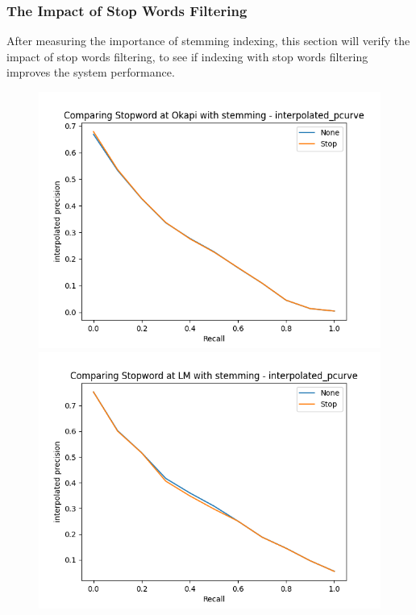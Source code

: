 \documentclass[10pt, a4paper]{article}
\begin{document}
\subsubsection{The Impact of Stop Words Filtering}
After measuring the importance of stemming indexing, this section will verify the impact of stop words filtering, to see if indexing with stop words filtering improves the system performance.
\begin{figure}[h!]
\centering
\includegraphics[scale=0.3]{compare stop/Comparing Stopword at Okapi with stemming - interpolated_pcurve-ipd.png}
\includegraphics[scale=0.3]{compare stop/Comparing Stopword at LM with stemming - interpolated_pcurve-ipd.png}

\end{figure}
\end{document}

